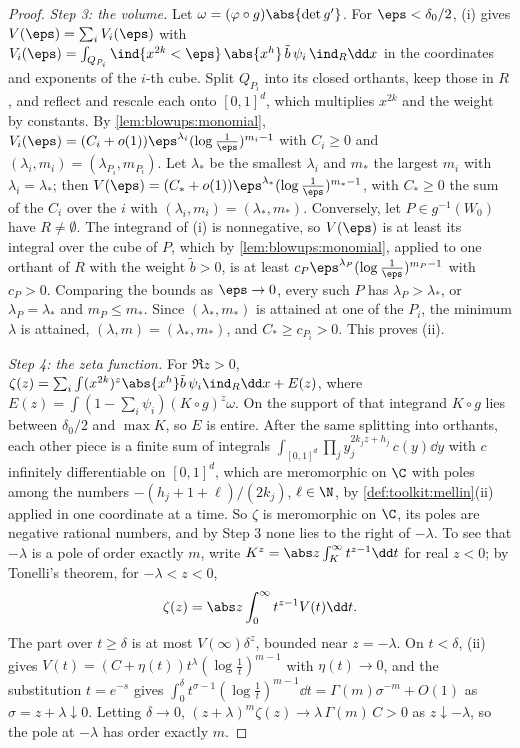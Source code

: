 \begin{refsection}
\begin{proof}
\emph{Step 3: the volume.} Let $\omega=(\varphi\circ g)\abs{\det g'}$. For $\eps<\delta_0/2$, (i) gives $V(\eps)=\sum_iV_i(\eps)$ with $V_i(\eps)=\int_{Q_{P_i}}\ind\{x^{2k}<\eps\}\,\abs{x^h}\,\tilde b\,\psi_i\,\ind_R\dd x$ in the coordinates and exponents of the $i$-th cube. Split $Q_{P_i}$ into its closed orthants, keep those in $R$, and reflect and rescale each onto $[0,1]^d$, which multiplies $x^{2k}$ and the weight by constants. By \cref{lem:blowups:monomial}, $V_i(\eps)=(C_i+o(1))\eps^{\lambda_i}(\log\frac1\eps)^{m_i-1}$ with $C_i\ge0$ and $(\lambda_i,m_i)=(\lambda_{P_i},m_{P_i})$. Let $\lambda_*$ be the smallest $\lambda_i$ and $m_*$ the largest $m_i$ with $\lambda_i=\lambda_*$; then $V(\eps)=(C_*+o(1))\eps^{\lambda_*}(\log\frac1\eps)^{m_*-1}$, with $C_*\ge0$ the sum of the $C_i$ over the $i$ with $(\lambda_i,m_i)=(\lambda_*,m_*)$. Conversely, let $P\in g^{-1}(W_0)$ have $R\ne\emptyset$. The integrand of (i) is nonnegative, so $V(\eps)$ is at least its integral over the cube of $P$, which by \cref{lem:blowups:monomial}, applied to one orthant of $R$ with the weight $\tilde b>0$, is at least $c_P\eps^{\lambda_P}(\log\frac1\eps)^{m_P-1}$ with $c_P>0$. Comparing the bounds as $\eps\to0$, every such $P$ has $\lambda_P>\lambda_*$, or $\lambda_P=\lambda_*$ and $m_P\le m_*$. Since $(\lambda_*,m_*)$ is attained at one of the $P_i$, the minimum $\lambda$ is attained, $(\lambda,m)=(\lambda_*,m_*)$, and $C_*\ge c_{P_i}>0$. This proves (ii).

\emph{Step 4: the zeta function.} For $\Re z>0$, $\zeta(z)=\sum_i\int(x^{2k})^z\abs{x^h}\tilde b\,\psi_i\ind_R\dd x+E(z)$, where $E(z)=\int(1-\sum_i\psi_i)(K\circ g)^z\omega$. On the support of that integrand $K\circ g$ lies between $\delta_0/2$ and $\max K$, so $E$ is entire. After the same splitting into orthants, each other piece is a finite sum of integrals $\int_{[0,1]^d}\prod_jy_j^{2k_jz+h_j}\,c(y)\dd y$ with $c$ infinitely differentiable on $[0,1]^d$, which are meromorphic on $\C$ with poles among the numbers $-(h_j+1+\ell)/(2k_j)$, $\ell\in\N$, by \cref{def:toolkit:mellin}(ii) applied in one coordinate at a time. So $\zeta$ is meromorphic on $\C$, its poles are negative rational numbers, and by Step 3 none lies to the right of $-\lambda$. To see that $-\lambda$ is a pole of order exactly $m$, write $K^z=\abs z\int_K^\infty t^{z-1}\dd t$ for real $z<0$; by Tonelli's theorem, for $-\lambda<z<0$,
\[
\zeta(z)=\abs z\int_0^\infty t^{z-1}V(t)\dd t .
\]
The part over $t\ge\delta$ is at most $V(\infty)\delta^z$, bounded near $z=-\lambda$. On $t<\delta$, (ii) gives $V(t)=(C+\eta(t))t^\lambda(\log\frac1t)^{m-1}$ with $\eta(t)\to0$, and the substitution $t=e^{-s}$ gives $\int_0^\delta t^{\sigma-1}(\log\frac1t)^{m-1}\dd t=\Gamma(m)\sigma^{-m}+O(1)$ as $\sigma=z+\lambda\downarrow0$. Letting $\delta\to0$, $(z+\lambda)^m\zeta(z)\to\lambda\,\Gamma(m)\,C>0$ as $z\downarrow-\lambda$, so the pole at $-\lambda$ has order exactly $m$.


\end{proof}
\end{refsection}
